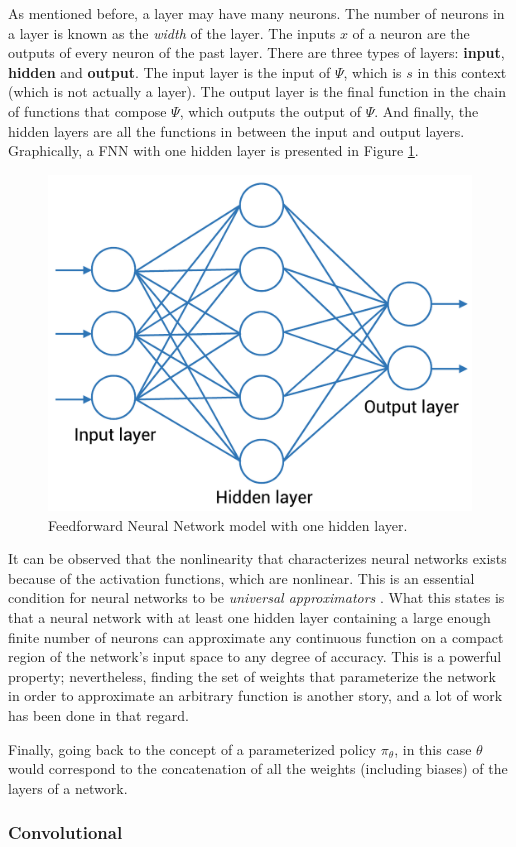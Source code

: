 As mentioned before, a layer may have many neurons. The number of neurons in a layer is known as the \emph{width} of the layer. The inputs $x$ of a neuron are the outputs of every neuron of the past layer.  There are three types of layers: \textbf{input}, \textbf{hidden} and \textbf{output}. The input layer is the input of $\Psi$, which is $s$ in this context (which is not actually a layer). The output layer is the final function in the chain of functions that compose $\Psi$, which outputs the output of $\Psi$. And finally, the hidden layers are all the functions in between the input and output layers. Graphically, a FNN with one hidden layer is presented in Figure \ref{fig:FNN}.

\begin{figure}[H]
    \centering
    \includegraphics[width=0.4\linewidth]{imagenes/cap1/nn.pdf}
    \caption{Feedforward Neural Network model with one hidden layer.}
    \label{fig:FNN}
\end{figure}

It can be observed that the nonlinearity that characterizes neural networks exists because of the activation functions, which are nonlinear. This is an essential condition for neural networks to be \emph{universal approximators} \cite{cybenko1989approximation, hornik1991approximation}. What this states is that a neural network with at least one hidden layer containing a large enough finite number of neurons can approximate any continuous function on a compact region of the network's input space to any degree of accuracy. This is a powerful property; nevertheless, finding the set of weights that parameterize the network in order to approximate an arbitrary function is another story, and a lot of work has been done in that regard. 

Finally, going back to the concept of a parameterized policy $\pi_{\theta}$, in this case $\theta$ would correspond to the concatenation of all the weights (including biases) of the layers of a network. \newline

\subsubsection{Convolutional}
    

